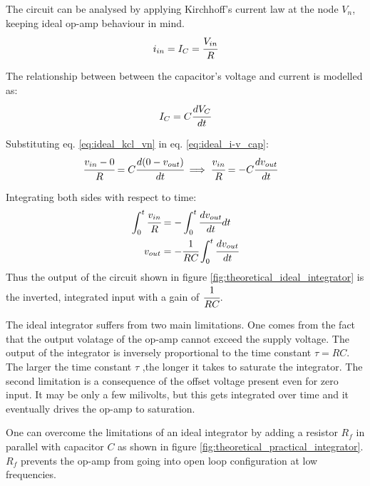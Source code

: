 \documentclass[12pt, titlepage]{article}
\theoremstyle{definition}
\begin{document}
    The circuit can be analysed by applying Kirchhoff's current law at the node $V_n$, keeping ideal op-amp behaviour in mind.
    \begin{equation}\label{eq:ideal_kcl_vn}
      i_{in} = I_C = \cfrac{V_{in}}{R}
    \end{equation}

    The relationship between between the capacitor's voltage and current is modelled as:
    \begin{equation}\label{eq:ideal_i-v_cap}
      I_C = C\cfrac{dV_C}{dt}
    \end{equation}

    Substituting eq. \ref{eq:ideal_kcl_vn} in eq. \ref{eq:ideal_i-v_cap}:
    \begin{align*}
      \cfrac{v_{in} - 0}{R} &= C\cfrac{d(0 - v_{out})}{dt}
      \implies \cfrac{v_{in}}{R} = -C\cfrac{dv_{out}}{dt}
    \end{align*}

    Integrating both sides with respect to time:
    \begin{align*}
      \int_0^t {\cfrac{v_{in}}{R}} &= - \int_0^t {\cfrac{dv_{out}}{dt}dt} \\
      v_{out} &= -\cfrac{1}{RC} \int_0^t {\cfrac{dv_{out}}{dt}}
    \end{align*}
    Thus the output of the circuit shown in figure \ref{fig:theoretical_ideal_integrator} is the inverted, integrated input with a gain of $\cfrac{1}{RC}$.

    The ideal integrator suffers from two main limitations. One comes from the fact that the output volatage of the op-amp cannot exceed the supply voltage.
    The output of the integrator is inversely proportional to the time constant $\tau = RC$.
    The larger the time constant $\tau$ ,the longer it takes to saturate the integrator.
    The second limitation is a consequence of the offset voltage present even for zero input.
    It may be only a few milivolts, but this gets integrated over time and it eventually drives the op-amp to saturation.

    One can overcome the limitations of an ideal integrator by adding a resistor $R_{f}$ in parallel with capacitor $C$ as shown in figure \ref{fig:theoretical_practical_integrator}. $R_{f}$ prevents the op-amp from going into open loop configuration at low frequencies.
\end{document}
